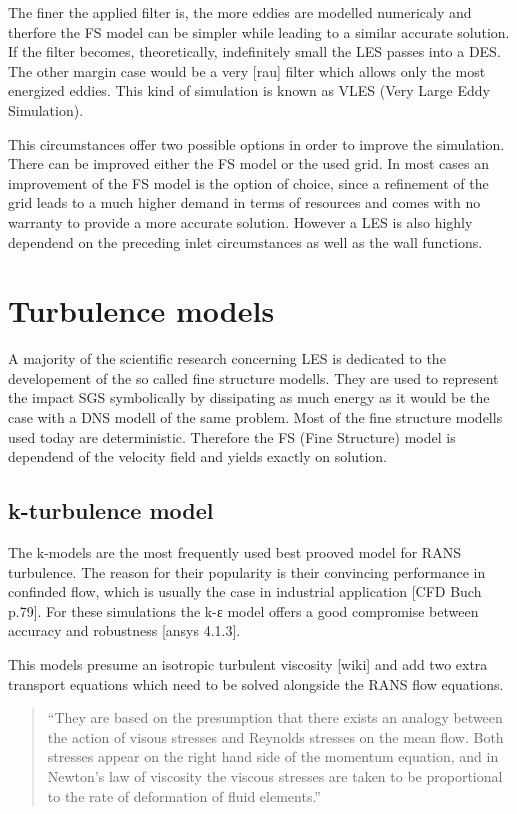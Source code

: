 The finer the applied filter is, the more eddies are modelled numericaly and therfore the FS model can be simpler while leading to a similar accurate solution. If the filter becomes, theoretically, indefinitely small the LES passes into a DES. The other margin case would be a very [rau] filter which allows only the most energized eddies. This kind of simulation is known as VLES (Very Large Eddy Simulation).

This circumstances offer two possible options in order to improve the simulation. There can be improved either the FS model or the used grid. In most cases an improvement of the FS model is the option of choice, since a refinement of the grid leads to a much higher demand in terms of resources and comes with no warranty to provide a more accurate solution. However a LES is also highly dependend on the preceding inlet circumstances as well as the wall functions.

\section{Turbulence models}
A majority of the scientific research concerning LES is dedicated to the developement of the so called fine structure modells. They are used to represent the impact SGS symbolically by dissipating as much energy as it would be the case with a DNS modell of the same problem. Most of the fine structure modells used today are deterministic. Therefore the FS (Fine Structure) model is dependend of the velocity field and yields exactly on solution.
\subsection{k-\textepsilon turbulence model}
The k-\textepsilon  models are the most frequently used best prooved model for RANS turbulence. The reason for their popularity is their convincing performance in confinded flow, which is usually the case in industrial application [CFD Buch p.79]. For these simulations the k-ε model offers a good compromise between accuracy and robustness [ansys 4.1.3].

This models presume an isotropic turbulent viscosity [wiki] and add two extra transport equations which need to be solved alongside the RANS flow equations.
\begin{quote}
``They are based on the presumption that there exists an analogy between the action of visous stresses and Reynolds stresses on the mean flow. Both stresses appear on the right hand side of the momentum equation, and in Newton’s law of viscosity the viscous stresses are taken to be proportional to the rate of deformation of fluid elements.''
\end{quote}
